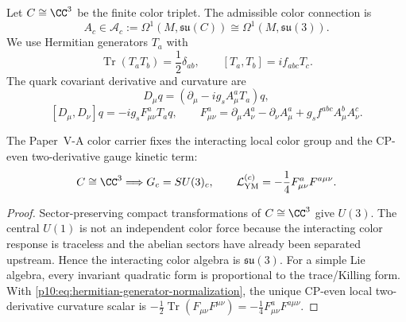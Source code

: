 \documentclass[12pt,a4paper]{article}
\begin{document}
\begin{definition}
\label{p10:def:admissible-color-connection}
Let \(C\cong\CC^3\) be the finite color triplet.  The admissible color connection is
\begin{equation}
\label{p10:eq:color-connection-space}
A_c\in\mathcal A_c:=\Omega^1(M,\mathfrak{su}(C))\cong\Omega^1(M,\mathfrak{su}(3)).
\end{equation}
We use Hermitian generators \(T_a\) with
\begin{equation}
\label{p10:eq:hermitian-generator-normalization}
\operatorname{Tr}(T_aT_b)=\frac12\delta_{ab},
\qquad
[T_a,T_b]=i f_{abc}T_c.
\end{equation}
The quark covariant derivative and curvature are
\begin{equation}
\label{p10:eq:qcd-covariant-derivative}
D_\mu q=(\partial_\mu-i g_s A_\mu^aT_a)q,
\end{equation}
\begin{equation}
\label{p10:eq:qcd-field-strength}
[D_\mu,D_\nu]q=-i g_s F_{\mu\nu}^aT_aq,
\qquad
F_{\mu\nu}^a=
\partial_\mu A_\nu^a-\partial_\nu A_\mu^a+g_s f^{abc}A_\mu^bA_\nu^c.
\end{equation}
\end{definition}

\begin{theorem}
\label{p10:thm:color-connection-kinetic-uniqueness}
The Paper~V-A color carrier fixes the interacting local color group and the CP-even two-derivative gauge kinetic term:
\begin{equation}
\label{p10:eq:ym-kinetic-output}
C\cong\CC^3
\Longrightarrow
G_c=SU(3)_c,
\qquad
\mathcal L_{\rm YM}^{(c)}=-\frac14F_{\mu\nu}^aF^{a\mu\nu}.
\end{equation}
\end{theorem}
\begin{proof}
Sector-preserving compact transformations of \(C\cong\CC^3\) give \(U(3)\).  The central \(U(1)\) is not an independent color force because the interacting color response is traceless and the abelian sectors have already been separated upstream.  Hence the interacting color algebra is \(\mathfrak{su}(3)\).  For a simple Lie algebra, every invariant quadratic form is proportional to the trace/Killing form.  With \eqref{p10:eq:hermitian-generator-normalization}, the unique CP-even local two-derivative curvature scalar is \(-\frac12\operatorname{Tr}(F_{\mu\nu}F^{\mu\nu})=-\frac14F_{\mu\nu}^aF^{a\mu\nu}\).\qedhere
\end{proof}
\end{document}
